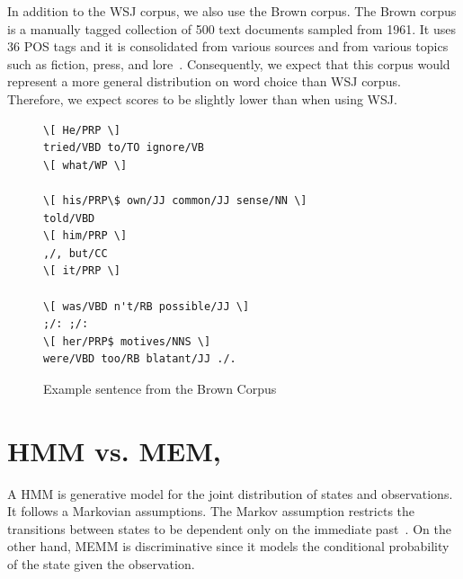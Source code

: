 \documentclass{acm_proc_article-sp}
\begin{document}
In addition to the WSJ corpus, we also use the Brown corpus. The Brown corpus is a manually tagged collection of 500 text documents sampled from 1961. It uses 36 POS tags and it is consolidated from various sources and from various topics such as fiction, press, and lore~\cite{brownCorpus}. Consequently, we expect that this corpus would represent a more general distribution on word choice than WSJ corpus. Therefore, we expect scores to be slightly lower than when using WSJ.

\begin{figure}[ht]
 \begin{Verbatim}[frame=single,framesep=5mm]
\[ He/PRP \]
tried/VBD to/TO ignore/VB 
\[ what/WP \]

\[ his/PRP\$ own/JJ common/JJ sense/NN \]
told/VBD 
\[ him/PRP \]
,/, but/CC 
\[ it/PRP \]

\[ was/VBD n't/RB possible/JJ \]
;/: ;/: 
\[ her/PRP$ motives/NNS \]
were/VBD too/RB blatant/JJ ./.

\end{Verbatim}
\caption{Example sentence from the Brown Corpus~\cite{brownCorpus} \label{brownExample}}
\end{figure}

\section{HMM vs. MEM,}
A HMM is generative model for the joint distribution of states and observations. It follows a Markovian assumptions. The Markov assumption restricts the transitions between states to be dependent only on the immediate past~\cite{nlpBook}. On the other hand, MEMM is discriminative since it models the conditional probability of the state given the observation. 
\end{document}
